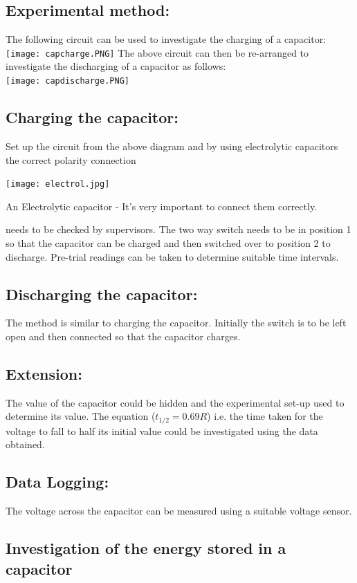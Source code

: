 \subsection{Experimental method:}
The following circuit can be used to investigate the charging of a capacitor:\\
\texttt{[image: capcharge.PNG]}
The above circuit can then be re-arranged to investigate the discharging of a capacitor as follows:\\
\texttt{[image: capdischarge.PNG]}
\subsection{Charging the capacitor:}
Set up the circuit from the above diagram and by using electrolytic capacitors the correct polarity connection \begin{marginfigure}
\texttt{[image: electrol.jpg]}
\caption{An Electrolytic capacitor - It's very important to connect them correctly.}
\end{marginfigure} needs to be checked by supervisors. The two way switch needs to be in position 1 so that the capacitor can be charged and then switched over to position 2 to discharge. Pre-trial readings can be taken to determine suitable time intervals.
\subsection{Discharging the capacitor:}
The method is similar to charging the capacitor. Initially the switch is to be left open and then connected so that the capacitor charges.
\subsection{Extension:}
The value of the capacitor could be hidden and the experimental set-up used to determine its value.
The equation ($t_{1/2}=0.69R$) i.e. the time taken for the voltage to fall to half its initial value could be investigated using the data obtained.
\subsection{Data Logging:} The voltage across the capacitor can be measured using a suitable voltage sensor.

\subsection{Investigation of the energy stored in a capacitor}
